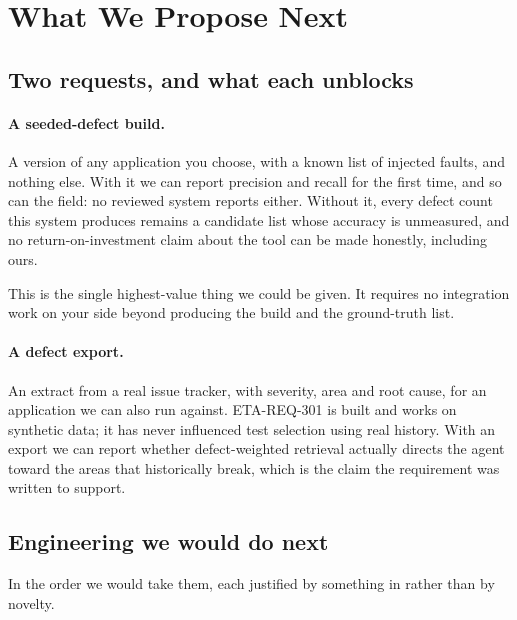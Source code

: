 \section{What We Propose Next}
\label{sec:next}

\subsection{Two requests, and what each unblocks}

\paragraph{A seeded-defect build.} A version of any application you choose,
with a known list of injected faults, and nothing else. With it we can report
precision and recall for the first time, and so can the field: no reviewed
system reports either. Without it, every defect count this system produces
remains a candidate list whose accuracy is unmeasured, and no return-on-investment
claim about the tool can be made honestly, including ours.

This is the single highest-value thing we could be given. It requires no
integration work on your side beyond producing the build and the ground-truth
list.

\paragraph{A defect export.} An extract from a real issue tracker, with
severity, area and root cause, for an application we can also run against.
ETA-REQ-301 is built and works on synthetic data; it has never influenced test
selection using real history. With an export we can report whether
defect-weighted retrieval actually directs the agent toward the areas that
historically break, which is the claim the requirement was written to support.

\subsection{Engineering we would do next}

In the order we would take them, each justified by something in
 rather than by novelty.

